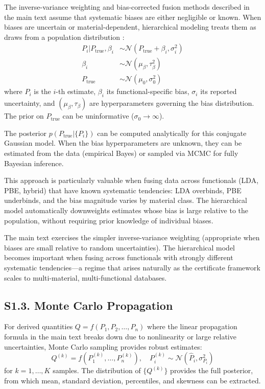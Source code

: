 \documentclass[onecolumn,superscriptaddress,amsmath,amssymb,longbibliography]{revtex4-2}
\begin{document}
The inverse-variance weighting and bias-corrected fusion methods described in
the main text assume that systematic biases are either negligible or known.
When biases are uncertain or material-dependent, hierarchical modeling treats
them as draws from a population distribution \cite{Kennedy2001,Sivia2006}:
\begin{align}
    P_i | P_{\mathrm{true}}, \beta_i &\sim \mathcal{N}(P_{\mathrm{true}} + \beta_i, \sigma_i^2) \\
    \beta_i &\sim \mathcal{N}(\mu_\beta, \tau_\beta^2) \\
    P_{\mathrm{true}} &\sim \mathcal{N}(\mu_0, \sigma_0^2)
\end{align}
where $P_i$ is the $i$-th estimate, $\beta_i$ its functional-specific bias,
$\sigma_i$ its reported uncertainty, and $(\mu_\beta, \tau_\beta)$ are
hyperparameters governing the bias distribution. The prior on
$P_{\mathrm{true}}$ can be uninformative ($\sigma_0 \to \infty$).

The posterior $p(P_{\mathrm{true}} | \{P_i\})$ can be computed analytically for
this conjugate Gaussian model. When the bias hyperparameters are unknown, they
can be estimated from the data (empirical Bayes) or sampled via MCMC for fully
Bayesian inference.

This approach is particularly valuable when fusing data across functionals
(LDA, PBE, hybrid) that have known systematic tendencies: LDA overbinds, PBE
underbinds, and the bias magnitude varies by material class. The hierarchical
model automatically downweights estimates whose bias is large relative to the
population, without requiring prior knowledge of individual biases.

The main text exercises the simpler inverse-variance weighting (appropriate
when biases are small relative to random uncertainties). The hierarchical
model becomes important when fusing across functionals with strongly different
systematic tendencies---a regime that arises naturally as the certificate
framework scales to multi-material, multi-functional databases.


\subsection{S1.3. Monte Carlo Propagation}
\label{sec:si_mc}

For derived quantities $Q = f(P_1, P_2, \ldots, P_n)$ where the linear
propagation formula in the main text breaks down due to nonlinearity or
large relative uncertainties, Monte Carlo sampling provides robust estimates:
\begin{equation}
    Q^{(k)} = f(P_1^{(k)}, \ldots, P_n^{(k)}), \quad
    P_i^{(k)} \sim \mathcal{N}(\hat{P}_i, \sigma_{P_i}^2)
\end{equation}
for $k = 1, \ldots, K$ samples. The distribution of $\{Q^{(k)}\}$ provides
the full posterior, from which mean, standard deviation, percentiles, and
skewness can be extracted.
\end{document}
